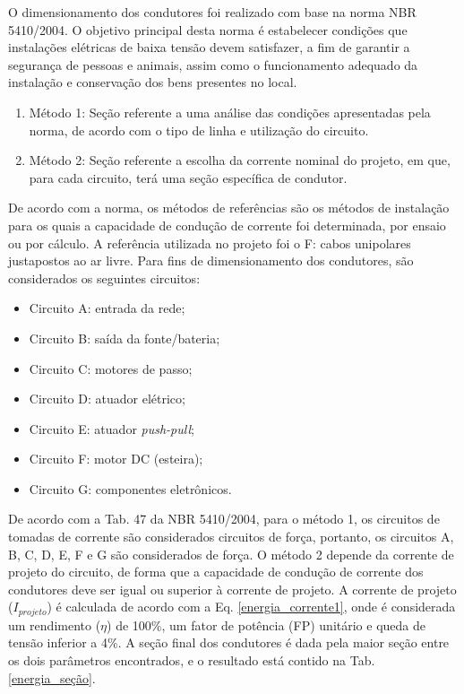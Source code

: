 O dimensionamento dos condutores foi realizado com base na norma NBR 5410/2004. O objetivo principal desta norma é estabelecer condições que instalações elétricas de baixa tensão devem satisfazer, a fim de garantir a segurança de pessoas e animais, assim como o funcionamento adequado da instalação e conservação dos bens presentes no local. 

\begin{enumerate}
    \item Método 1: Seção referente a uma análise das condições apresentadas pela norma, de acordo com o tipo de linha e utilização do circuito. 
    
    \item Método 2: Seção referente a escolha da corrente nominal do projeto, em que, para cada circuito, terá uma seção específica de condutor. 
\end{enumerate}

De acordo com a norma, os métodos de referências são os métodos de instalação para os quais a capacidade de condução de corrente foi determinada, por ensaio ou por cálculo. A referência utilizada no projeto foi o F: cabos unipolares justapostos ao ar livre. Para fins de dimensionamento dos condutores, são considerados os seguintes circuitos:

\begin{itemize}
    \item Circuito A: entrada da rede;
    
    \item Circuito B: saída da fonte/bateria;
    
    \item Circuito C: motores de passo;
    
    \item Circuito D: atuador elétrico;
    
    \item Circuito E: atuador \textit{push-pull};
    
    \item Circuito F: motor DC (esteira);
    
    \item Circuito G: componentes eletrônicos.
\end{itemize}

De acordo com a Tab. 47 da NBR 5410/2004, para o método 1, os circuitos de tomadas de corrente são considerados circuitos de força, portanto, os circuitos A, B, C, D, E, F e G são considerados de força. O método 2 depende da corrente de projeto do circuito, de forma que a capacidade de condução de corrente dos condutores deve ser igual ou superior à corrente de projeto. A corrente de projeto ($I_{projeto}$) é calculada de acordo com a Eq. \ref{energia_corrente1}, onde é considerada um rendimento ($\eta$) de 100\%, um fator de potência (FP) unitário e queda de tensão inferior a 4\%. A seção final dos condutores é dada pela maior seção entre os dois parâmetros encontrados, e o resultado está contido na Tab. \ref{energia_seção}.
    
